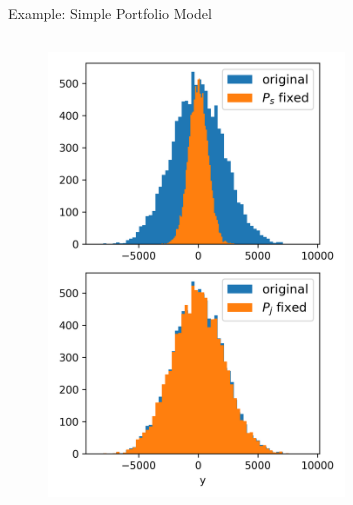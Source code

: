 \documentclass[english,aspectratio=169]{beamer}
\begin{document}
\begin{frame}[fragile]{Example: Simple Portfolio Model}
\begin{columns}[T,onlytextwidth]
\begin{column}{0.4\textwidth}
  \begin{figure}
    \centering
    \includegraphics[width=0.7\textwidth]{./figures/portfolio.png}
  \end{figure}
\end{column}

\end{columns}
  
\end{frame}
\end{document}

